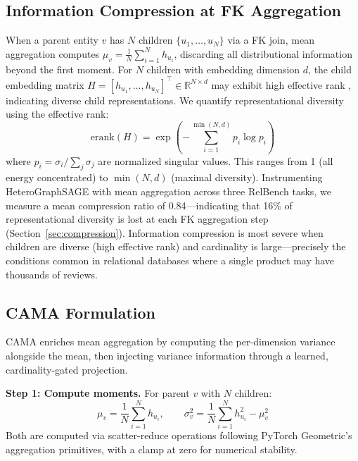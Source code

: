 \documentclass[11pt,letterpaper]{article}
\begin{document}
\subsection{Information Compression at FK Aggregation}
\label{sec:info_compression}

When a parent entity $v$ has $N$ children $\{u_1, \ldots, u_N\}$ via a FK join, mean aggregation computes $\mu_v = \frac{1}{N}\sum_{i=1}^{N} h_{u_i}$, discarding all distributional information beyond the first moment. For $N$ children with embedding dimension $d$, the child embedding matrix $H = [h_{u_1}, \ldots, h_{u_N}]^\top \in \mathbb{R}^{N \times d}$ may exhibit high effective rank \citep{Roy2007}, indicating diverse child representations. We quantify representational diversity using the effective rank:
\begin{equation}
\text{erank}(H) = \exp\!\left(-\sum_{i=1}^{\min(N,d)} p_i \log p_i\right)
\label{eq:erank}
\end{equation}
where $p_i = \sigma_i / \sum_j \sigma_j$ are normalized singular values. This ranges from 1 (all energy concentrated) to $\min(N, d)$ (maximal diversity). Instrumenting HeteroGraphSAGE \citep{Hamilton2017} with mean aggregation across three RelBench tasks, we measure a mean compression ratio of 0.84---indicating that 16\% of representational diversity is lost at each FK aggregation step (Section~\ref{sec:compression}). Information compression is most severe when children are diverse (high effective rank) and cardinality is large---precisely the conditions common in relational databases where a single product may have thousands of reviews.

\subsection{CAMA Formulation}
\label{sec:cama}

CAMA enriches mean aggregation by computing the per-dimension variance alongside the mean, then injecting variance information through a learned, cardinality-gated projection.

\textbf{Step 1: Compute moments.} For parent $v$ with $N$ children:
\begin{equation}
\mu_v = \frac{1}{N}\sum_{i=1}^{N} h_{u_i}, \qquad \sigma_v^2 = \frac{1}{N}\sum_{i=1}^{N} h_{u_i}^2 - \mu_v^2
\label{eq:moments}
\end{equation}
Both are computed via scatter-reduce operations following PyTorch Geometric's aggregation primitives, with a clamp at zero for numerical stability.
\end{document}
